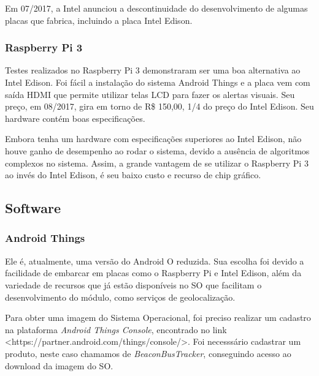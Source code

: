 \documentclass[
	12pt,				%
	oneside,			%
	a4paper,			%
	brazil				%
]{abntex2}
\begin{document}
{Em 07/2017, a Intel anunciou a descontinuidade do desenvolvimento de algumas placas que fabrica, incluindo a placa Intel Edison.

\subsubsection{Raspberry Pi 3}

Testes realizados no Raspberry Pi 3 demonstraram ser uma boa alternativa ao Intel Edison. Foi fácil a instalação do sistema Android Things e a placa vem com saída HDMI que permite utilizar telas LCD para fazer os alertas visuais.
Seu preço, em 08/2017, gira em torno de R\$ 150,00, 1/4 do preço do Intel Edison. Seu hardware contém boas especificações.

Embora tenha um hardware com especificações superiores ao Intel Edison, não houve ganho de desempenho ao rodar o sistema, devido a ausência de algoritmos complexos no sistema. Assim, a grande vantagem de se utilizar o Raspberry Pi 3 ao invés do Intel Edison, é seu baixo custo e recurso de chip gráfico.

\subsection{Software}

\subsubsection{Android Things}

Ele é, atualmente, uma versão do Android O reduzida. Sua escolha foi devido a facilidade de embarcar em placas como o Raspberry Pi e Intel Edison, além da variedade de recursos que já estão disponíveis no SO que facilitam o desenvolvimento do módulo, como serviços de geolocalização. 

Para obter uma imagem do Sistema Operacional, foi preciso realizar um cadastro na plataforma \textit{Android Things Console}, encontrado no link <https://partner.android.com/things/console/>. Foi necesssário cadastrar um produto, neste caso chamamos de \textit{BeaconBusTracker}, conseguindo acesso ao download da imagem do SO.

}
\end{document}
